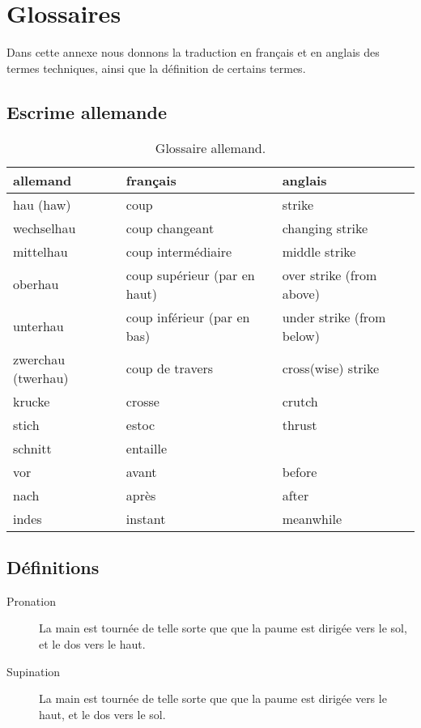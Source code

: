 \chapter{Glossaires}


Dans cette annexe nous donnons la traduction en français et en anglais des termes techniques, ainsi que la définition de certains termes.





\section{Escrime allemande}


\begin{table}[h]
	\centering
	\begin{tabular}{lll}
		allemand &
			français &
			anglais
			\\
		\hline
		hau (haw) &
			coup &
			strike
			\\
		wechselhau &
			coup changeant &
			changing strike
			\\
		mittelhau &
			coup intermédiaire &
			middle strike
			\\
		oberhau &
			coup supérieur (par en haut) &
			over strike (from above)
			\\
		unterhau &
			coup inférieur (par en bas) &
			under strike (from below)
			\\
		zwerchau (twerhau) &
			coup de travers &
			cross(wise) strike
			\\
		krucke &
			crosse &
			crutch
			\\
		stich &
			estoc &
			thrust
			\\
		schnitt &
			entaille &
			\\
		vor &
			avant &
			before
			\\
		nach &
			après &
			after
			\\
		indes &
			instant &
			meanwhile
	\end{tabular}
	\caption{Glossaire allemand.}
	\label{app:tab:glossaire-allemand}
\end{table}


\section{Définitions}


\begin{description}
	\item[Pronation] La main est tournée de telle sorte que que la paume est dirigée vers le sol, et le dos vers le haut.
	
	\item[Supination] La main est tournée de telle sorte que que la paume est dirigée vers le haut, et le dos vers le sol.
\end{description}

